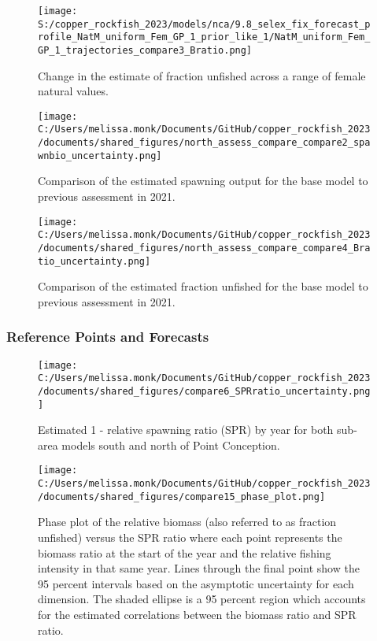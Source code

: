 \documentclass[11pt,
  english,
  letterpaper,
]{article}
\begin{document}
\begin{figure}
\centering
\texttt{[image: S:/copper\_rockfish\_2023/models/nca/9.8\_selex\_fix\_forecast\_profile\_NatM\_uniform\_Fem\_GP\_1\_prior\_like\_1/NatM\_uniform\_Fem\_GP\_1\_trajectories\_compare3\_Bratio.png]}
\caption{Change in the estimate of fraction unfished across a range of female natural values.\label{fig:m-depl}}
\end{figure}

\begin{figure}
\centering
\texttt{[image: C:/Users/melissa.monk/Documents/GitHub/copper\_rockfish\_2023/documents/shared\_figures/north\_assess\_compare\_compare2\_spawnbio\_uncertainty.png]}
\caption{Comparison of the estimated spawning output for the base model to previous assessment in 2021.\label{fig:comp-assess-sb}}
\end{figure}

\newpage

\begin{figure}
\centering
\texttt{[image: C:/Users/melissa.monk/Documents/GitHub/copper\_rockfish\_2023/documents/shared\_figures/north\_assess\_compare\_compare4\_Bratio\_uncertainty.png]}
\caption{Comparison of the estimated fraction unfished for the base model to previous assessment in 2021.\label{fig:comp-assess-depl}}
\end{figure}

\newpage

\hypertarget{reference-points-and-forecasts}{%
\subsubsection{Reference Points and Forecasts}\label{reference-points-and-forecasts}}

\begin{figure}
\centering
\texttt{[image: C:/Users/melissa.monk/Documents/GitHub/copper\_rockfish\_2023/documents/shared\_figures/compare6\_SPRratio\_uncertainty.png]}
\caption{Estimated 1 - relative spawning ratio (SPR) by year for both sub-area models south and north of Point Conception.\label{fig:1-spr}}
\end{figure}

\clearpage

\begin{figure}
\centering
\texttt{[image: C:/Users/melissa.monk/Documents/GitHub/copper\_rockfish\_2023/documents/shared\_figures/compare15\_phase\_plot.png]}
\caption{Phase plot of the relative biomass (also referred to as fraction unfished) versus the SPR ratio where each point represents the biomass ratio at the start of the year and the relative fishing intensity in that same year. Lines through the final point show the 95 percent intervals based on the asymptotic uncertainty for each dimension. The shaded ellipse is a 95 percent region which accounts for the estimated correlations between the biomass ratio and SPR ratio.\label{fig:phase}}
\end{figure}
\end{document}

